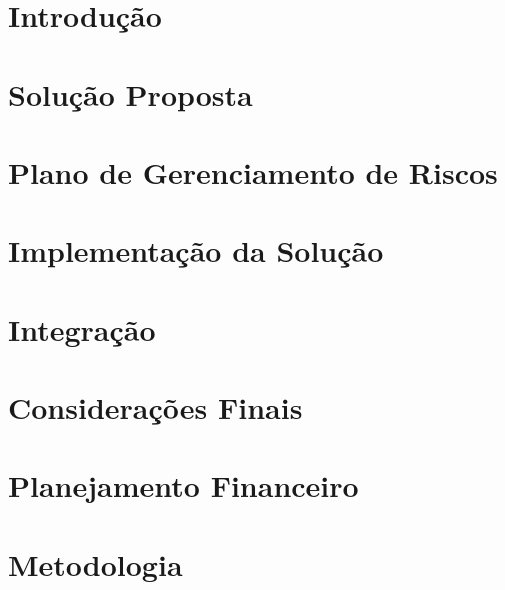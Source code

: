 % 



\chapter{Introdução} %


\chapter{Solução Proposta} %

\label{cha:solucao}


\chapter{Plano de Gerenciamento de Riscos}

\label{cha:riscos}

\chapter{Implementação da Solução}

\label{cha:solucao2}

\chapter{Integração}

\label{cha:integracao}

\chapter{Considerações Finais}

\label{cha:trabalhosfuturos}

\chapter{Planejamento Financeiro}

\label{cha:financeiro}

\chapter{Metodologia}

\label{cha:metodologia}
